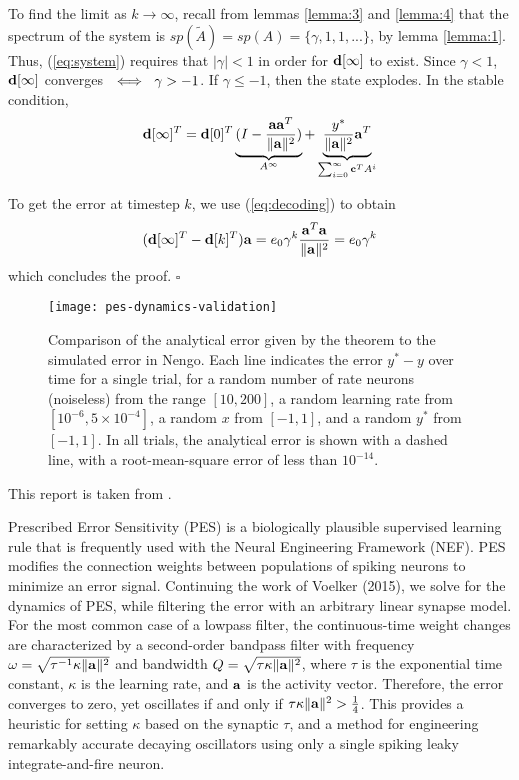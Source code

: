 To find the limit as $k \rightarrow \infty$, recall from lemmas \ref{lemma:3} and \ref{lemma:4} that the spectrum of the system is $sp(\tilde{A}) = sp(A) = \{\gamma, 1, 1, ...\}$, by lemma \ref{lemma:1}. Thus, (\ref{eq:system}) requires that $|\gamma| < 1$ in order for $\mathbf{d}[\infty]$ to exist. Since $\gamma < 1$, $\mathbf{d}[\infty]$ converges $\ \iff{}\  \gamma > -1$. If $\gamma \le -1$, then the state explodes. In the stable condition,
\begin{equation*}
\mathbf{d}[\infty]^T = \mathbf{d}[0]^T\underbrace{(I - \frac{\mathbf{a}\mathbf{a}^T}{\|\mathbf{a}\|^2})}_{A^\infty} + \underbrace{\frac{y^*}{\|\mathbf{a}\|^2} \mathbf{a}^T}_{\sum_{i=0}^{\infty} \mathbf{c}^T A^i}
\end{equation*}

To get the error at timestep $k$, we use (\ref{eq:decoding}) to obtain
\begin{equation*}(\mathbf{d}[\infty]^T - \mathbf{d}[k]^T)\mathbf{a} = e_0 \gamma^k \frac{\mathbf{a}^T \mathbf{a}}{\|\mathbf{a}\|^2} = e_0 \gamma^k\end{equation*}
which concludes the proof. \hfill $\square$

\begin{figure}
\centering
\texttt{[image: pes-dynamics-validation]}
\caption{\label{fig:pes-dynamics-validation} Comparison of the analytical error given by the theorem to the simulated error in Nengo. Each line indicates the error $y^* - y$ over time for a single trial, for a random number of rate neurons (noiseless) from the range $
[10, 200]$, a random learning rate from $[10^{-6}, 5 \times 10^{-4}]$, a random $x$ from $[-1, 1]$, and a random $y^*$ from $[-1, 1]$. In all trials, the analytical error is shown with a dashed line, with a root-mean-square error of less than $10^{-14}$.}
\end{figure}

This report is taken from \citep{voelker2017c}.

Prescribed Error Sensitivity (PES) is a biologically plausible supervised learning rule that is frequently used with the Neural Engineering Framework (NEF).
PES modifies the connection weights between populations of spiking neurons to minimize an error signal.
Continuing the work of Voelker (2015), we solve for the dynamics of PES, while filtering the error with an arbitrary linear synapse model. 
For the most common case of a lowpass filter, the continuous-time weight changes are characterized by a second-order bandpass filter with frequency $\omega = \sqrt{\tau^{-1} \kappa \|\mathbf{a}\|^2 }$ and bandwidth $Q = \sqrt{\tau \kappa \|\mathbf{a}\|^2 }$, where $\tau$ is the exponential time constant, $\kappa$ is the learning rate, and $\mathbf{a}$ is the activity vector.
Therefore, the error converges to zero, yet oscillates if and only if $\tau \kappa \|\mathbf{a}\|^2 > \frac{1}{4}$.
This provides a heuristic for setting $\kappa$ based on the synaptic $\tau$, and a method for engineering remarkably accurate decaying oscillators using only a single spiking leaky integrate-and-fire neuron.

